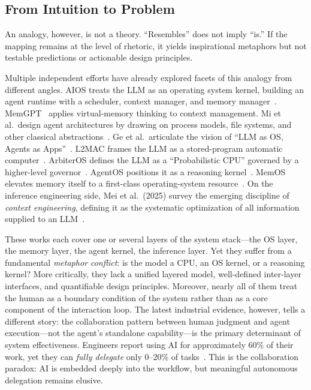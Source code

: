 \documentclass[11pt,a4paper]{article}
\begin{document}
\subsection{From Intuition to Problem}

An analogy, however, is not a theory.
``Resembles'' does not imply ``is.''
If the mapping remains at the level of rhetoric, it yields inspirational metaphors but not testable predictions or actionable design principles.

Multiple independent efforts have already explored facets of this analogy from different angles.
AIOS treats the LLM as an operating system kernel, building an agent runtime with a scheduler, context manager, and memory manager~\cite{mei2024aios}.
MemGPT~\cite{memgpt2023} applies virtual-memory thinking to context management.
Mi et al.\ design agent architectures by drawing on process models, file systems, and other classical abstractions~\cite{mi2025llmagentscomputersystems}.
Ge et al.\ articulate the vision of ``LLM as OS, Agents as Apps''~\cite{ge2023llmos}.
L2MAC frames the LLM as a stored-program automatic computer~\cite{holt2024l2mac}.
ArbiterOS defines the LLM as a ``Probabilistic CPU'' governed by a higher-level governor~\cite{arbiteros2025}.
AgentOS positions it as a reasoning kernel~\cite{agentos2025}.
MemOS elevates memory itself to a first-class operating-system resource~\cite{memos2025}.
On the inference engineering side, Mei et al.\ (2025) survey the emerging discipline of \emph{context engineering}, defining it as the systematic optimization of all information supplied to an LLM~\cite{contextengineer_survey2025}.

These works each cover one or several layers of the system stack---the OS layer, the memory layer, the agent kernel, the inference layer.
Yet they suffer from a fundamental \emph{metaphor conflict}: is the model a CPU, an OS kernel, or a reasoning kernel?
More critically, they lack a unified layered model, well-defined inter-layer interfaces, and quantifiable design principles.
Moreover, nearly all of them treat the human as a boundary condition of the system rather than as a core component of the interaction loop.
The latest industrial evidence, however, tells a different story: the collaboration pattern between human judgment and agent execution---not the agent's standalone capability---is the primary determinant of system effectiveness.
Engineers report using AI for approximately 60\% of their work, yet they can \emph{fully delegate} only 0--20\% of tasks~\cite{anthropic2026agenticreport}.
This is the collaboration paradox: AI is embedded deeply into the workflow, but meaningful autonomous delegation remains elusive.
\end{document}
